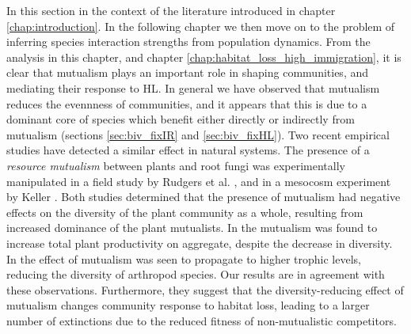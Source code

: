 In this section  in the context of the literature introduced in chapter \ref{chap:introduction}. In the following chapter we then move on to the problem of inferring species interaction strengths from population dynamics. From the analysis in this chapter, and chapter \ref{chap:habitat_loss_high_immigration}, it is clear that mutualism plays an important role in shaping communities, and mediating their response to HL. In general we have observed that mutualism reduces the evennness of communities, and it appears that this is due to a dominant core of species which benefit either directly or indirectly from mutualism (sections \ref{sec:biv_fixIR} and \ref{sec:biv_fixHL}). Two recent empirical studies have detected a similar effect in natural systems. The presence of a \emph{resource mutualism} between plants and root fungi was experimentally manipulated in a field study by Rudgers et al. \cite{rudgers2008invasive}, and in a mesocosm experiment by Keller \cite{keller2014mutualistic}. Both studies determined that the presence of mutualism had negative effects on the diversity of the plant community as a whole, resulting from increased dominance of the plant mutualists. In \cite{keller2014mutualistic} the mutualism was found to increase total plant productivity on aggregate, despite the decrease in diversity. In \cite{rudgers2008invasive} the effect of mutualism was seen to propagate to higher trophic levels, reducing the diversity of arthropod species. Our results are in agreement with these observations. Furthermore, they suggest that the diversity-reducing effect of mutualism changes community response to habitat loss, leading to a larger number of extinctions due to the reduced fitness of non-mutualistic competitors. 

